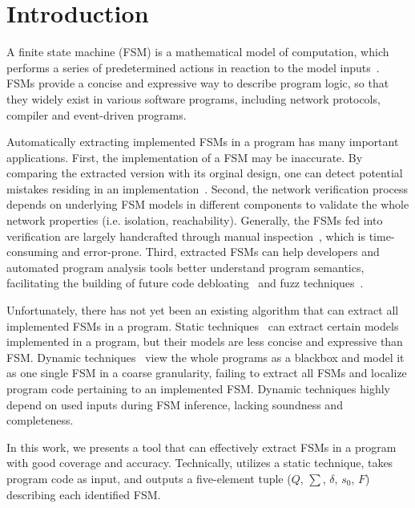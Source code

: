 \section{Introduction}

A finite state machine (FSM) is a mathematical model of computation, 
which performs a series of predetermined actions in 
reaction to the model inputs~\cite{fsm}. 
FSMs provide a concise and expressive way to describe
program logic, so that they widely exist in various software programs, 
including network protocols, 
compiler and event-driven programs. 

Automatically extracting implemented FSMs in a program has 
many important applications. 
First, the implementation of a FSM may be inaccurate. By 
 comparing the extracted version with its orginal design, one 
can detect potential mistakes residing in an implementation~\cite{protocol-bug}. 
Second, the network verification process depends on underlying FSM models 
in different components to validate the whole network properties 
(i.e. isolation, reachability).
Generally, the FSMs fed into verification are largely handcrafted through 
manual inspection~\cite{fayaz2016buzz,SymNet}, which is time-consuming and error-prone. 
Third, extracted FSMs can help developers and automated program analysis tools
better understand program semantics, facilitating the building of future 
code debloating~\cite{container-debloating-1,container-debloating-2,dinghao-1} 
and fuzz techniques~\cite{afl,Angora,youwei-1}.


Unfortunately, there has not yet been an existing algorithm that can extract 
all implemented FSMs in a program.
Static techniques~\cite{wu2016automatic,khalid2016paving} 
can extract certain models implemented in a program,
but their models are less concise and expressive than FSM. 
Dynamic techniques~\cite{angluin1987learning,moon2019alembic,cho2011mace} 
view the whole programs as a blackbox and 
model it as one single FSM in a coarse granularity, 
failing to extract all FSMs and localize program code 
pertaining to an implemented FSM. 
Dynamic techniques highly depend on used inputs during FSM inference, 
lacking soundness and completeness.  

In this work, we presents a tool \Tool{} that can effectively extract FSMs in a program
with good coverage and accuracy. Technically,  
\Tool{} utilizes a static technique, takes program code as input, 
and outputs a five-element tuple ($Q$, $\sum$, $\delta$, $s_0$, $F$) 
describing each identified FSM. 


